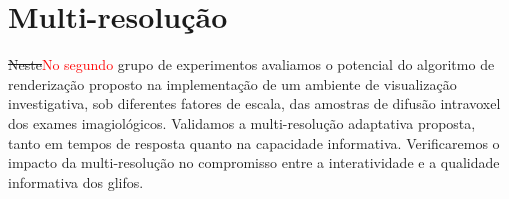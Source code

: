 


\section{Multi-resolução}
\label{sec::multi_resolução_e_performance_em_ambiente_de visualização_multimodal}

\sout{Neste}\textcolor{red}{No segundo} grupo de experimentos avaliamos o potencial do algoritmo de renderização proposto na implementação de um ambiente de visualização investigativa, sob diferentes fatores de escala, das amostras de difusão intravoxel dos exames imagiológicos. Validamos a  multi-resolução adaptativa proposta, tanto em tempos de resposta quanto na capacidade informativa. Verificaremos o impacto da multi-resolução no compromisso entre a interatividade e a qualidade informativa dos glifos.











